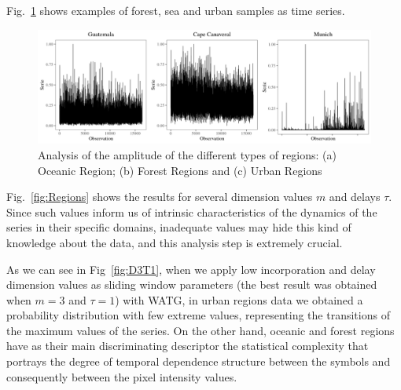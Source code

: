 \documentclass{isprs}
\begin{document}
	
	Fig.~\ref{fig:AmplitudeSAR} shows examples of forest, sea and urban samples as time series.
	
	\begin{figure}[hbt]
		\includegraphics[width=\columnwidth]{Figures/SAR_signal.pdf}
		\caption{Analysis of the amplitude of the different types of regions: (a) Oceanic Region; (b) Forest Regions and (c) Urban Regions}
		\label{fig:AmplitudeSAR}
	\end{figure}
	
	
	Fig.~\ref{fig:Regions} shows the results for several dimension values $m$ and delays $\tau$.
	Since such values inform us of intrinsic characteristics of the dynamics of the series in their specific domains, inadequate values may hide this kind of knowledge about the data, and this analysis step is extremely crucial.
	
	As we can see in Fig~\ref{fig:D3T1}, when we apply low incorporation and delay dimension values as sliding window parameters (the best result was obtained when $m = 3$ and $\tau = 1$) with WATG, in urban regions data we obtained a probability distribution with few extreme values, representing the transitions of the maximum values of the series.
	On the other hand, oceanic and forest regions have as their main discriminating descriptor the statistical complexity that portrays the degree of temporal dependence structure between the symbols and consequently between the pixel intensity values.
	
\end{document}
